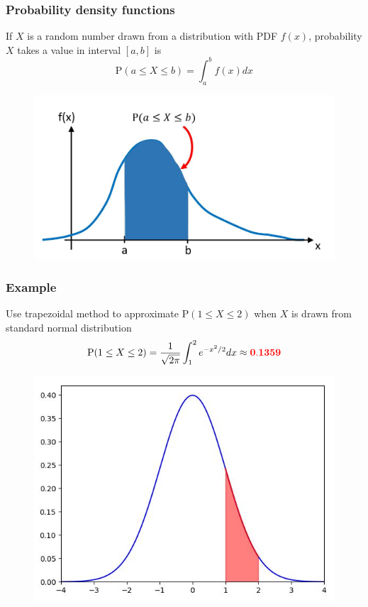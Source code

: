 \documentclass[english,14pt]{beamer}
\newcommand\red[1]{{\color{red} #1}}
\begin{document}

\begin{frame}[fragile]

\frametitle{Probability density functions}

If $X$ is a random number drawn from a distribution with PDF $f(x)$, probability $X$ takes a value in interval $[a,b]$ is
\vspace*{-2mm}
\[
	\boxed{
\mathrm{P}(a \leq X \leq b) = \int_a^b f(x) dx}
\]
\vspace*{-5mm}
\begin{figure}[ht]
	\centering
	\includegraphics[width=.7\textwidth]{figures/genericPDF}
\end{figure}

\end{frame}


\begin{frame}[fragile]

\frametitle{Example}

Use trapezoidal method to approximate $\mathrm{P}(1 \leq X \leq 2)$ when $X$ is drawn from standard normal distribution
\[
\mathrm{P}(1 \leq X \leq 2) = \frac{1}{\sqrt{2\pi}} \int_1^2 e^{-x^2/2} dx \approx \mathbf{\red{0.1359}}
\]

\vspace*{-5mm}
\begin{figure}[ht]
	\centering
	\includegraphics[width=.5\textwidth]{figures/stdnormal_12}
\end{figure}

\end{frame}
\end{document}
